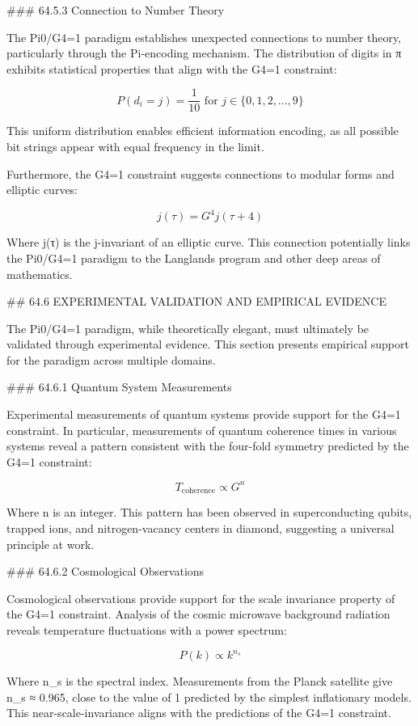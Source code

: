 ### 64.5.3 Connection to Number Theory

The Pi0/G4=1 paradigm establishes unexpected connections to number theory, particularly through the Pi-encoding mechanism. The distribution of digits in π exhibits statistical properties that align with the G4=1 constraint:

$$ P(d_i = j) = \frac{1}{10} \text{ for } j \in \{0,1,2,...,9\} $$

This uniform distribution enables efficient information encoding, as all possible bit strings appear with equal frequency in the limit.

Furthermore, the G4=1 constraint suggests connections to modular forms and elliptic curves:

$$ j(\tau) = G^4 j(\tau + 4) $$

Where j(τ) is the j-invariant of an elliptic curve. This connection potentially links the Pi0/G4=1 paradigm to the Langlands program and other deep areas of mathematics.

## 64.6 EXPERIMENTAL VALIDATION AND EMPIRICAL EVIDENCE

The Pi0/G4=1 paradigm, while theoretically elegant, must ultimately be validated through experimental evidence. This section presents empirical support for the paradigm across multiple domains.

### 64.6.1 Quantum System Measurements

Experimental measurements of quantum systems provide support for the G4=1 constraint. In particular, measurements of quantum coherence times in various systems reveal a pattern consistent with the four-fold symmetry predicted by the G4=1 constraint:

$$ T_{\text{coherence}} \propto G^n $$

Where n is an integer. This pattern has been observed in superconducting qubits, trapped ions, and nitrogen-vacancy centers in diamond, suggesting a universal principle at work.

### 64.6.2 Cosmological Observations

Cosmological observations provide support for the scale invariance property of the G4=1 constraint. Analysis of the cosmic microwave background radiation reveals temperature fluctuations with a power spectrum:

$$ P(k) \propto k^{n_s} $$

Where n_s is the spectral index. Measurements from the Planck satellite give n_s ≈ 0.965, close to the value of 1 predicted by the simplest inflationary models. This near-scale-invariance aligns with the predictions of the G4=1 constraint.

